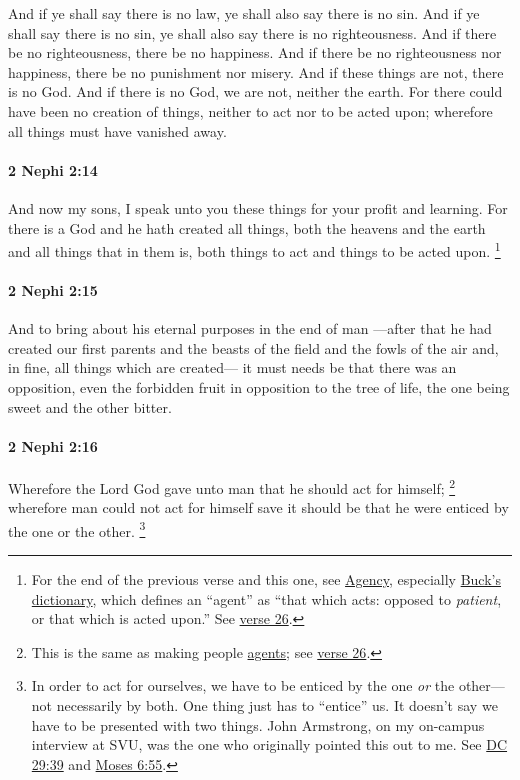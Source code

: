 			And if ye shall say there is no law,
			ye shall also say there is no sin.
			And if ye shall say there is no sin,
			ye shall also say there is no righteousness.
			And if there be no righteousness,
			there be no happiness.
			And if there be no righteousness nor happiness,
			there be no punishment nor misery.
			And if these things are not,
			there is no God.
			And if there is no God,
			we are not, neither the earth.
			For there could have been no creation of things,
			neither to act nor to be acted upon;
			wherefore all things must have vanished away.
			
		\paragraph{2 Nephi 2:14} %
			\label{2NEPHI-2-14}

			And now my sons,
			I speak unto you these things for your profit and learning.
			For there is a God and he hath created all things,
			both the heavens and the earth and all things that in them is,
			both things to act and things to be acted upon.%
			\footnote{%
				For the end of the previous verse and this one, see \hyperref[AGENCY]{Agency}, especially \hyperref[AGENCY-BTD]{Buck's dictionary}, which defines an ``agent'' as ``that which acts: opposed to \textit{patient}, or that which is acted upon.'' See \hyperref[2NEPHI-2-26]{verse 26}.
				} 

		\paragraph{2 Nephi 2:15} %
			\label{2NEPHI-2-15}

			And to bring about his eternal purposes in the end of man
			---after that he had created our first parents
			and the beasts of the field and the fowls of the air
			and, in fine, all things which are created---
			it must needs be that there was an opposition,
			even the forbidden fruit in opposition to the tree of life,
			the one being sweet and the other bitter.

		\paragraph{2 Nephi 2:16} %
			\label{2NEPHI-2-16}

			Wherefore the Lord God gave unto man that he should act for himself;%
				\footnote{%
					This is the same as making people \hyperref[AGENCY]{agents}; see \hyperref[2NEPHI-2-26]{verse 26}.
					}
			wherefore man could not act for himself
			save it should be that he were enticed by the one or the other.%
				\footnote{%
					\label{2NEPHI-2-16-or}%
					In order to act for ourselves, we have to be enticed by the one \textit{or} the other---not necessarily by both. One thing just has to ``entice'' us. It doesn't say we have to be presented with two things. John Armstrong, on my on-campus interview at SVU, was the one who originally pointed this out to me. See \hyperref[DC29-39]{DC 29:39} and \hyperref[MOSES-6-55]{Moses 6:55}.
					}

